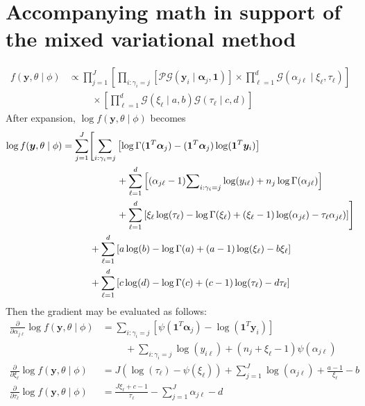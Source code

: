 
\section{Accompanying math in support of the mixed variational method}

\begin{equation}
    \begin{aligned}
        f(\bm{y},\theta\mid\phi) &\propto \mathcal \prod_{j = 1}^J\left[\prod_{i:\gamma_i = j}\left[\mathcal{PG}(\bm{y}_i\mid\bm{\alpha}_j,\bm{1})\right]\times\prod_{\ell = 1}^d\mathcal{G}(\alpha_{j\ell}\mid\xi_{\ell},\tau_{\ell})\right] \\
        &\hspace{1cm}\times \left[\prod_{\ell = 1}^d\mathcal{G}(\xi_{\ell}\mid a, b)\mathcal{G}(\tau_{\ell}\mid c,d)\right]        
    \end{aligned}
\end{equation}
After expansion, $\log f(\bm{y},\theta\mid\phi)$ becomes
\begin{equation}
    \begin{aligned}
    \log f(\bm{y},\theta\mid\phi) &= \sum_{j = 1}^J\Biggl[
    \sum_{i:\gamma_i = j}\left[\log\Gamma(\bm{1}^T\bm{\alpha}_j) - (\bm{1}^T\bm{\alpha}_j)\log(\bm{1}^T\bm{y}_i)\right]\\
    &\hspace{2cm}+ \sum_{\ell = 1}^d\left[(\alpha_{j\ell} - 1){\small\sum}_{i:\gamma_i = j}\log(y_{i\ell}) + n_j\log\Gamma(\alpha_{j\ell})\right]\\
    &\hspace{2cm}+ \sum_{\ell = 1}^d\left[\xi_{\ell}\log(\tau_{\ell}) - \log\Gamma(\xi_{\ell}) + (\xi_{\ell} - 1)\log(\alpha_{j\ell}) - \tau_{\ell}\alpha_{j\ell})\right]
    \Biggr]\\
    &\hspace{1cm}+ \sum_{\ell = 1}^d\left[a\log(b) - \log\Gamma(a) + (a - 1)\log(\xi_{\ell}) - b\xi_{\ell}\right]\\
    &\hspace{1cm}+ \sum_{\ell = 1}^d\left[c\log(d) - \log\Gamma(c) + (c - 1)\log(\tau_{\ell}) - d\tau_{\ell}\right]   
    \end{aligned}
\end{equation}
Then the gradient may be evaluated as follows:
\begin{equation}
    \begin{aligned}
        \frac{\partial}{\partial \alpha_{j\ell}} \log f(\bm{y},\theta\mid\phi) &= \sum_{i:\gamma_i = j}\left[\psi(\bm{1}^T\bm{\alpha}_j) - \log(\bm{1}^T\bm{y}_i)\right]\\
        &\hspace{1cm}+ \sum_{i:\gamma_i = j}\log(y_{i\ell}) + (n_j + \xi_{\ell} - 1)\psi(\alpha_{j\ell})\\
        \frac{\partial}{\partial \xi_{\ell}}\log f(\bm{y},\theta\mid\phi) &= J\left(\log(\tau_{\ell}) - \psi(\xi_{\ell})\right) + \sum_{j = 1}^J\log(\alpha_{j\ell}) + \frac{a - 1}{\xi_{\ell}} - b\\
        \frac{\partial}{\partial \tau_{\ell}}\log f(\bm{y},\theta\mid\phi) &= \frac{J\xi_{\ell} + c - 1}{\tau_{\ell}} - \sum_{j = 1}^J \alpha_{j\ell} - d        
    \end{aligned}   
\end{equation}
